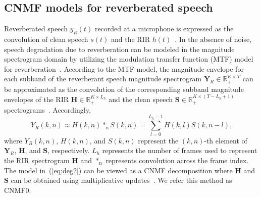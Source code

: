 \subsection{CNMF models for reverberated speech}
Reverberated speech $y_R(t)$ recorded at a microphone is expressed as the convolution of clean speech $s(t)$ and the RIR $h(t)$~\cite{naylor2010speech}. %
In the absence of noise, speech degradation due to reverberation can be modeled in the magnitude spectrogram domain by utilizing the modulation transfer function (MTF) model for reverberation~\cite{kameoka2009robust}. According to the MTF  model, the magnitude envelope for each subband of the reverberant speech magnitude spectrogram $\mathbf{Y}_R \in \mathbb{R}^{K \times T}_{+}$ can be approximated as the convolution of the corresponding subband magnitude envelopes of the RIR $\mathbf{H} \in \mathbb{R}^{K \times L_h}_{+}$ and the clean speech $\mathbf{S} \in \mathbb{R}^{K \times (T-L_h +1)}_{+}$ spectrograms~\cite{Kumar2011}. Accordingly, 
\begin{equation}
Y_R(k,n) \approx H(k,n)*_{\text{n}} S(k,n)=\sum_{l=0}^{L_h-1}H(k,l)S(k,n-l)\text{,}
\label{eq:deg2}
\end{equation}
where $Y_R(k,n)$, $H(k,n)$, and $S(k,n)$ represent the $(k,n)$-th element of $\mathbf{Y}_R$, $\mathbf{H}$, and $\mathbf{S}$, respectively. $L_h$ represents the number of frames used to represent the RIR spectrogram $\mathbf{H}$ and $*_{\text{n}}$ represents convolution across the frame index. The model in~(\ref{eq:deg2}) can be viewed as a CNMF decomposition where $\mathbf{H}$ and $\mathbf{S}$ can be obtained using multiplicative updates~\cite{kameoka2009robust}. We refer this method as CNMF0.

